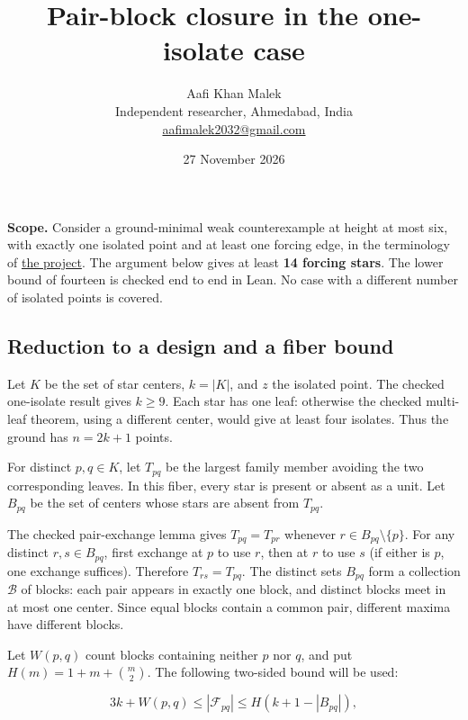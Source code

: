\documentclass[
  11pt,
]{article}
\title{Pair-block closure in the one-isolate case}
\author{Aafi Khan Malek\\[-2pt]\small Independent researcher, Ahmedabad, India\\[-2pt]\small\href{mailto:aafimalek2032@gmail.com}{aafimalek2032@gmail.com}}
\date{27 November 2026}
\begin{document}
\maketitle

\textbf{Scope.} Consider a ground-minimal weak counterexample at height
at most six, with exactly one isolated point and at least one forcing
edge, in the terminology of
\href{https://github.com/Aafimalek/novel-discoveries/blob/research/parallel-foundations/frankl-height-six/further-reductions.md}{the
project}. The argument below gives at least \textbf{14 forcing stars}.
The lower bound of fourteen is checked end to end in Lean. No case with
a different number of isolated points is covered.

\subsection{Reduction to a design and a fiber
bound}\label{reduction-to-a-design-and-a-fiber-bound}

Let \(K\) be the set of star centers, \(k=|K|\), and \(z\) the isolated
point. The checked one-isolate result gives \(k\ge 9\). Each star has
one leaf: otherwise the checked multi-leaf theorem, using a different
center, would give at least four isolates. Thus the ground has
\(n=2k+1\) points.

For distinct \(p,q\in K\), let \(T_{pq}\) be the largest family member
avoiding the two corresponding leaves. In this fiber, every star is
present or absent as a unit. Let \(B_{pq}\) be the set of centers whose
stars are absent from \(T_{pq}\).

The checked pair-exchange lemma gives \(T_{pq}=T_{pr}\) whenever
\(r\in B_{pq}\setminus\{p\}\). For any distinct \(r,s\in B_{pq}\), first
exchange at \(p\) to use \(r\), then at \(r\) to use \(s\) (if either is
\(p\), one exchange suffices). Therefore \(T_{rs}=T_{pq}\). The distinct
sets \(B_{pq}\) form a collection \(\mathcal{B}\) of blocks: each pair
appears in exactly one block, and distinct blocks meet in at most one
center. Since equal blocks contain a common pair, different maxima have
different blocks.

Let \(W(p,q)\) count blocks containing neither \(p\) nor \(q\), and put
\(H(m)=1+m+\binom m2\). The following two-sided bound will be used:

\[
 3k+W(p,q) \le |\mathcal{F}_{pq}| \le H(k+1-|B_{pq}|),
 \tag{1}
\]
\end{document}
